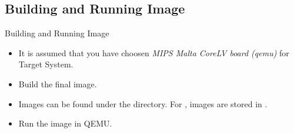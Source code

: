 \subsection{Building and Running Image}
\begin{frame}[fragile]{Building and Running Image}
    \pause
    \begin{itemize}[<+-|alert@+>]
        \item It is assumed that you have choosen \textit{MIPS Malta CoreLV board (qemu)} for Target System.
        \item Build the final image. \\
        \item Images can be found under the  directory. For , images are stored in .
        \item Run the image in QEMU. \\
               \\
    \end{itemize}
\end{frame}